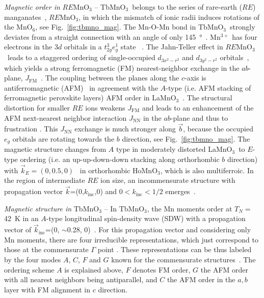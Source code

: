 \documentclass[aps,prb,twocolumn,superscriptaddress,showpacs,floatfix]{revtex4-2}
\newcommand{\tbmno}{TbMnO$_3$}
\newcommand{\lamno}{LaMnO$_3$}
\newcommand{\baxis}{$\vec{b}$}
\newcommand{\REmno}{$RE$MnO$_3$}
\begin{document}
{\it Magnetic order in} $RE$MnO$_3$ -- \tbmno\ belongs to the series of rare-earth ($RE$) manganates~\cite{Jensen1991}, \REmno , in which the mismatch of ionic radii induces rotations of the MnO$_6$, see Fig.~\ref{fig:tbmno_mag}.
The Mn-O-Mn bond in \tbmno \ strongly deviates from a straight
connection with an angle of only \SI{145}{\degree}~\cite{Kimura2003a,Blasco2000}.
Mn$^{3+}$ has four electrons in the $3d$ orbitals in a $t^3_{2g}e_g^1$ state ~\cite{Rodriguez-Carvajal1998}.
The Jahn-Teller effect in \REmno\ leads to a staggered ordering of single-occupied $d_{3x^2-r^2}$ and $d_{3y^2-r^2}$ orbitals~\cite{Rodriguez-Carvajal1998}, which yields a strong ferromagnetic (FM) nearest-neighbor exchange in the $ab$-plane, $J_{\textrm{FM}}$~\cite{Kimura2003a}. The coupling between the planes along the $c$-axis is antiferromagnetic (AFM)~\cite{Kimura2003a} in agreement with the $A$-type (i.e. AFM stacking of ferromagnetic perovskite layers) AFM order in \lamno ~\cite{Kajimoto2005,Goodenough1955}.
The structural distortion for smaller $RE$ ions weakens $J_{\textrm{FM}}$ and leads to an enhancement of the AFM next-nearest neighbor interaction $J_{\textrm{NN}}$ in the $ab$-plane and thus to frustration \cite{Mochizuki2009a,Fontcuberta2015}.
This $J_{\textrm{NN}}$ exchange is much stronger along \baxis , because the occupied $e_g$ orbitals are rotating towards
the $b$ direction, see Fig.~\ref{fig:tbmno_mag}.
The magnetic structure changes from $A$ type in moderately distorted \lamno \ to $E$-type ordering (i.e. an up-up-down-down stacking along orthorhombic $b$ direction) with $\vec{k}_E=(0,0.5,0)$~\cite{Kimura2003a,Ishiwata2010,Mochizuki2009a,Fontcuberta2015} in orthorhombic HoMnO$_3$, which is also multiferroic.
In the region of intermediate $RE$ ion size, an incommensurate structure with propagation vector $\vec{k}$=(0,$k_{\textrm{inc}}$,0)  and $0<k_{\textrm{inc}}<1/2$ emerges~\cite{Kimura2003a,Mochizuki2009a,Fontcuberta2015}.

{\it Magnetic structure in} TbMnO$_3$ -- In \tbmno, the Mn moments order at $T_N=\,$\SI{42}{\kelvin} in an $A$-type longitudinal spin-density wave (SDW)
with a propagation vector of $\vec{k}_{\textrm{inc}}$=(0, $\sim$0.28, 0)~\cite{Quezel1977}. For this propagation vector and considering only Mn moments, there are four irreducible representations, which just correspond to those at the commensurate $\Gamma$ point \cite{Kajimoto2004}.
These representations can be thus labeled by  the four modes $A$, $C$, $F$ and $G$ known for the commensurate structures~\cite{Bertaut1968,Kajimoto2004,Aliouane2008}. 
The ordering scheme $A$ is explained above, $F$ denotes FM order,
$G$ the AFM order with all nearest neighbors being antiparallel, and $C$ the AFM order in the $a,b$ layer with FM alignment in $c$ direction.
\end{document}
